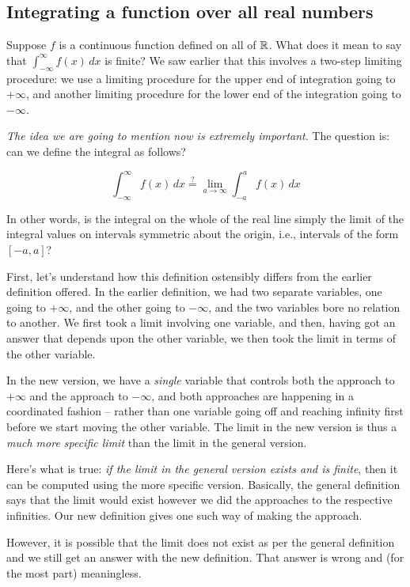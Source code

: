 \documentclass[10pt]{amsart}
\begin{document}
\subsection{Integrating a function over all real numbers}

Suppose $f$ is a continuous function defined on all of $\mathbb{R}$. What does
it mean to say that $\int_{-\infty}^{\infty} f(x) \, dx$ is finite? We
saw earlier that this involves a two-step limiting procedure: we use a
limiting procedure for the upper end of integration going to
$+\infty$, and another limiting procedure for the lower end of the
integration going to $-\infty$.

{\em The idea we are going to mention now is extremely important}. The
question is: can we define the integral as follows?

$$\int_{-\infty}^\infty f(x) \, dx \stackrel{?}{=} \lim_{a \to \infty} \int_{-a}^a f(x) \, dx$$

In other words, is the integral on the whole of the real line simply
the limit of the integral values on intervals symmetric about the
origin, i.e., intervals of the form $[-a,a]$?

First, let's understand how this definition ostensibly differs from
the earlier definition offered. In the earlier definition, we had two
separate variables, one going to $+\infty$, and the other going to
$-\infty$, and the two variables bore no relation to another. We first
took a limit involving one variable, and then, having got an answer
that depends upon the other variable, we then took the limit in terms
of the other variable.

In the new version, we have a {\em single} variable that controls both
the approach to $+\infty$ and the approach to $-\infty$, and both
approaches are happening in a coordinated fashion -- rather than one
variable going off and reaching infinity first before we start moving
the other variable. The limit in the new version is thus a {\em much
more specific limit} than the limit in the general version.

Here's what is true: {\em if the limit in the general version exists
and is finite}, then it can be computed using the more specific
version. Basically, the general definition says that the limit would
exist however we did the approaches to the respective infinities. Our
new definition gives one such way of making the approach.

However, it is possible that the limit does not exist as per the
general definition and we still get an answer with the new
definition. That answer is wrong and (for the most part) meaningless.
\end{document}
